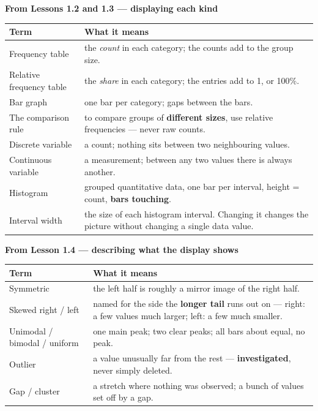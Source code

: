\documentclass[12pt]{article}
\begin{document}
\vspace{7pt}
\textbf{From Lessons 1.2 and 1.3 --- displaying each kind}
\par\vspace{3pt}
\noindent\begin{tabularx}{\linewidth}{@{} l X @{}}
\rowcolor{sky}
\textbf{Term} & \textbf{What it means} \\
\midrule
Frequency table & the \emph{count} in each category; the counts add to the group size. \\
Relative frequency table & the \emph{share} in each category; the entries add to 1, or 100\%. \\
Bar graph & one bar per category; gaps between the bars. \\
The comparison rule & to compare groups of \textbf{different sizes}, use relative frequencies ---
                   never raw counts. \\
Discrete variable & a count; nothing sits between two neighbouring values. \\
Continuous variable & a measurement; between any two values there is always another. \\
Histogram & grouped quantitative data, one bar per interval, height = count,
                   \textbf{bars touching}. \\
Interval width & the size of each histogram interval. Changing it changes the picture without
                   changing a single data value. \\
\end{tabularx}

\vspace{7pt}
\textbf{From Lesson 1.4 --- describing what the display shows}
\par\vspace{3pt}
\noindent\begin{tabularx}{\linewidth}{@{} l X @{}}
\rowcolor{sky}
\textbf{Term} & \textbf{What it means} \\
\midrule
Symmetric & the left half is roughly a mirror image of the right half. \\
Skewed right / left & named for the side the \textbf{longer tail} runs out on --- right: a few
                   values much larger; left: a few much smaller. \\
Unimodal / bimodal / uniform & one main peak; two clear peaks; all bars about equal, no peak. \\
Outlier & a value unusually far from the rest --- \textbf{investigated}, never simply deleted. \\
Gap / cluster & a stretch where nothing was observed; a bunch of values set off by a gap. \\
\end{tabularx}
\end{document}
